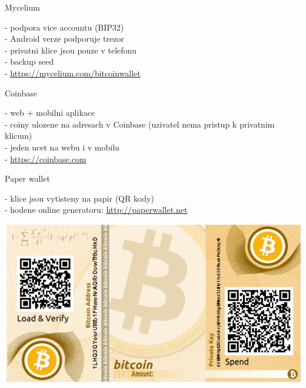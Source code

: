\documentclass{beamer}
\begin{document}
\begin{frame}

    {\LARGE Mycelium}\\

    \vspace{5mm}

    - podpora vice accountu (BIP32)\\
    - Android verze podporuje trezor\\
    - privatni klice jsou pouze v telefonu\\
    - backup seed\\
    - \url{https://mycelium.com/bitcoinwallet}\\

    \vspace{10mm}

    {\LARGE Coinbase}\\

    \vspace{5mm}

    - web + mobilni aplikace\\
    - coiny ulozene na adresach v Coinbase (uzivatel nema pristup k privatnim klicum)\\
    - jeden ucet na webu i v mobilu\\
    - \url{https://coinbase.com}\\

\end{frame}

\begin{frame}

    {\LARGE Paper wallet}\\

    \vspace{5mm}

    - klice jsou vytisteny na papir (QR kody)\\
    - hodene online generatoru: \url{http://paperwallet.net}\\

    \vspace{5mm}

    \includegraphics[scale=0.3]{img/paperwallet}

\end{frame}
\end{document}
